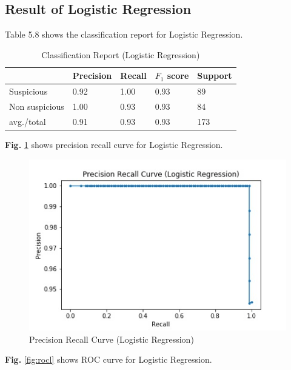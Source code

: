 \documentclass[12pt,a4paper]{report}
\begin{document}

\subsection{Result of Logistic Regression}
Table 5.8 shows the classification report for Logistic Regression.

\begin{table}[h!]
\begin{center}
\caption{Classification Report (Logistic Regression)}
\begin{tabular}{|m{4.4cm} | m{2cm}| m{2cm}| m{2cm}| m{2cm}|}
\hline
     & Precision & Recall & $F_1$ score & Support \\
\hline
     Suspicious & 0.92 & 1.00 & 0.93 & 89\\
\hline 
     Non suspicious  & 1.00 & 0.93 & 0.93 & 84\\
\hline 
     avg./total & 0.91 & 0.93 & 0.93 & 173\\
\hline
\end{tabular}
\end{center}
\end{table}

\noindent
\textbf{Fig.} \ref{fig:prl} shows precision recall curve for Logistic Regression.

\begin{figure}[h!]
    \centering
    \includegraphics[scale=0.58]{Figures/PRL.jpg}
    \caption{Precision Recall Curve (Logistic Regression)}
    \label{fig:prl}
\end{figure}

\noindent
\textbf{Fig.} \ref{fig:rocl} shows ROC curve for Logistic Regression.
\end{document}
